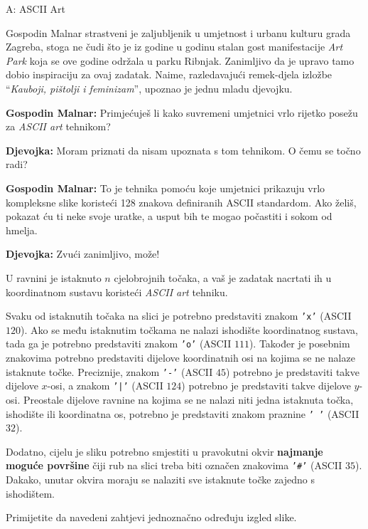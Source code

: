 \begin{statement}[
  timelimit=1 s,
  memorylimit=512 MiB,
]{A: ASCII Art}

Gospodin Malnar strastveni je zaljubljenik u umjetnost i urbanu kulturu grada
Zagreba, stoga ne čudi što je iz godine u godinu stalan gost manifestacije
\textit{Art Park} koja se ove godine održala u parku Ribnjak. Zanimljivo da
je upravo tamo dobio inspiraciju za ovaj zadatak. Naime, razledavajući
remek-djela izložbe ``\textit{Kauboji, pištolji i feminizam}'', upoznao je
jednu mladu djevojku.

\textbf{Gospodin Malnar:} Primjećuješ li kako suvremeni umjetnici vrlo
rijetko posežu za \textit{ASCII art} tehnikom?

\textbf{Djevojka:} Moram priznati da nisam upoznata s tom tehnikom. O čemu se
točno radi?

\textbf{Gospodin Malnar:} To je tehnika pomoću koje umjetnici prikazuju vrlo
kompleksne slike koristeći 128 znakova definiranih ASCII standardom. Ako
želiš, pokazat ću ti neke svoje uratke, a usput bih te mogao počastiti i
sokom od hmelja.

\textbf{Djevojka:} Zvući zanimljivo, može!

U ravnini je istaknuto $n$ cjelobrojnih točaka, a vaš je zadatak nacrtati ih u
koordinatnom sustavu koristeći \textit{ASCII art} tehniku.

Svaku od istaknutih točaka na slici je potrebno predstaviti znakom
\texttt{'x'} (ASCII $120$). Ako se među istaknutim točkama ne nalazi
ishodište koordinatnog sustava, tada ga je potrebno predstaviti znakom
\texttt{'o'} (ASCII $111$).  Također je posebnim znakovima potrebno
predstaviti dijelove koordinatnih osi na kojima se ne nalaze istaknute točke.
Preciznije, znakom \texttt{'-'} (ASCII $45$) potrebno je predstaviti takve
dijelove $x$-osi, a znakom \texttt{'|'} (ASCII $124$) potrebno je predstaviti
takve dijelove $y$-osi.  Preostale dijelove ravnine na kojima se ne nalazi
niti jedna istaknuta točka, ishodište ili koordinatna os, potrebno je
predstaviti znakom praznine \texttt{' '} (ASCII $32$).

Dodatno, cijelu je sliku potrebno smjestiti u pravokutni okvir \textbf{najmanje
moguće površine} čiji rub na slici treba biti označen znakovima \texttt{'\#'}
(ASCII $35$). Dakako, unutar okvira moraju se nalaziti sve istaknute točke
zajedno s ishodištem.

Primijetite da navedeni zahtjevi jednoznačno određuju izgled slike.


\end{statement}
